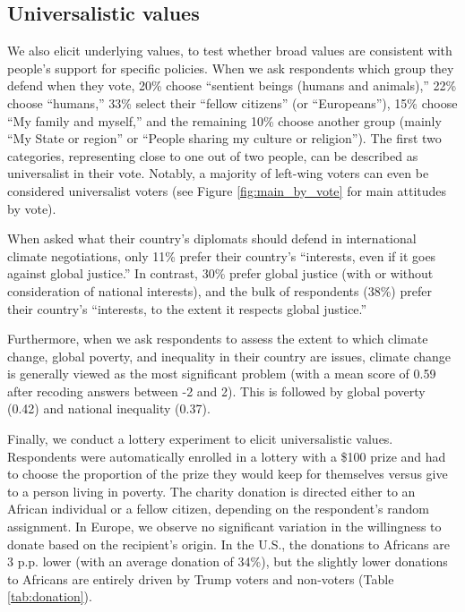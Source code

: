 \subsection{Universalistic values}\label{subsec:universalistic}

We also elicit underlying values, to test whether broad values are consistent with people's support for specific policies. %
When we ask respondents which group they defend when they vote, %
20\% choose ``sentient beings (humans and animals),'' 22\% choose ``humans,'' 33\% select their ``fellow citizens'' (or ``Europeans''), 15\% choose ``My family and myself,'' and the remaining 10\% choose another group (mainly ``My State or region'' or ``People sharing my culture or religion''). The first two categories, representing close to one out of two people, can be described as universalist in their vote. Notably,  a majority of left-wing voters can even be considered universalist voters (see Figure \ref{fig:main_by_vote} for main attitudes by vote).%

When asked what their country's diplomats should defend in international climate negotiations, only 11\% prefer their country's ``interests, even if it goes against global justice.'' In contrast, 30\% prefer global justice (with or without consideration of national interests), and the bulk of respondents (38\%) prefer their country's ``interests, to the extent it respects global justice.''

Furthermore, when we ask respondents to assess the extent to which climate change, global poverty, and inequality in their country are issues, climate change is generally viewed as the most significant problem (with a mean score of 0.59 after recoding answers between -2 and 2). This is followed by global poverty (0.42) and national inequality (0.37). %

Finally, we conduct a lottery experiment to elicit universalistic values. Respondents were automatically enrolled in a lottery with a \$100 prize and had to choose the proportion of the prize they would keep for themselves versus give to a person living in poverty. The charity donation is directed either to an African individual or a fellow citizen, depending on the respondent's random assignment. In Europe, we observe no significant variation in the willingness to donate based on the recipient's origin. In the U.S., the donations to Africans are 3 p.p. lower (with an average donation of 34\%), but the slightly lower donations to Africans are entirely driven by Trump voters and non-voters (Table \ref{tab:donation}).

